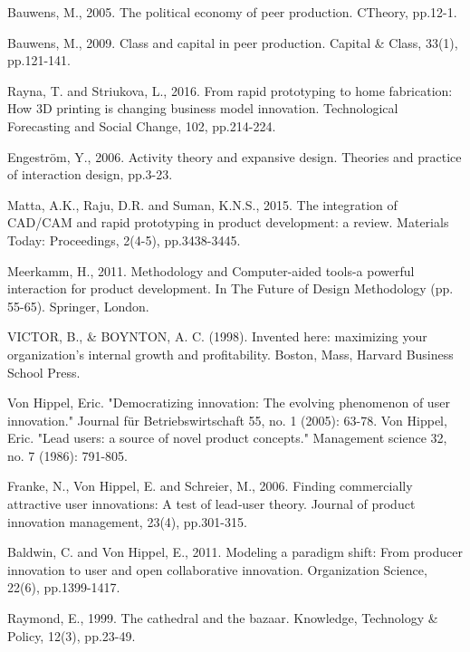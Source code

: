 Bauwens, M., 2005. The political economy of peer production. CTheory, pp.12-1.

Bauwens, M., 2009. Class and capital in peer production. Capital & Class, 33(1), pp.121-141.

Rayna, T. and Striukova, L., 2016. From rapid prototyping to home fabrication: How 3D printing is changing business model innovation. Technological Forecasting and Social Change, 102, pp.214-224.

Engeström, Y., 2006. Activity theory and expansive design. Theories and practice of interaction design, pp.3-23.

Matta, A.K., Raju, D.R. and Suman, K.N.S., 2015. The integration of CAD/CAM and rapid prototyping in product development: a review. Materials Today: Proceedings, 2(4-5), pp.3438-3445.

Meerkamm, H., 2011. Methodology and Computer-aided tools-a powerful interaction for product development. In The Future of Design Methodology (pp. 55-65). Springer, London.


VICTOR, B., & BOYNTON, A. C. (1998). Invented here: maximizing your organization's internal growth and profitability. Boston, Mass, Harvard Business School Press.

Von Hippel, Eric. "Democratizing innovation: The evolving phenomenon of user innovation." Journal für Betriebswirtschaft 55, no. 1 (2005): 63-78.
Von Hippel, Eric. "Lead users: a source of novel product concepts." Management science 32, no. 7 (1986): 791-805.

Franke, N., Von Hippel, E. and Schreier, M., 2006. Finding commercially attractive user innovations: A test of lead‐user theory. Journal of product innovation management, 23(4), pp.301-315.

Baldwin, C. and Von Hippel, E., 2011. Modeling a paradigm shift: From producer innovation to user and open collaborative innovation. Organization Science, 22(6), pp.1399-1417.

Raymond, E., 1999. The cathedral and the bazaar. Knowledge, Technology & Policy, 12(3), pp.23-49.



